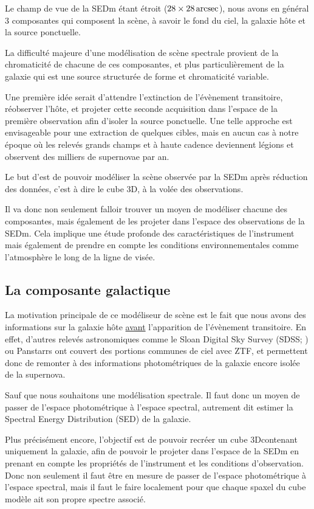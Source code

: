 \documentclass[../main/main.tex]{subfiles}
\begin{document}
Le champ de vue de la SEDm étant étroit ($28\times28\arcsec$), nous
avons en général $3$ composantes qui composent la
scène, à savoir le fond du ciel, la galaxie hôte et la source ponctuelle.

La difficulté majeure d'une modélisation de scène spectrale provient de la chromaticité de chacune de ces
composantes, et plus particulièrement de la galaxie qui est une source
structurée de forme et chromaticité variable.

Une première idée serait d'attendre l'extinction de l'évènement
transitoire, réobserver l'hôte, et projeter cette seconde acquisition
dans l'espace de la première observation afin d'isoler la source
ponctuelle. Une telle approche est envisageable pour une extraction de
quelques cibles, mais en aucun cas à notre époque où les relevés grands
champs et à haute cadence deviennent légions et observent des milliers
de supernovae par an.

Le but d'\hypergal est de pouvoir modéliser la scène observée
par la SEDm après réduction des données, c'est à dire le cube 3D, à la
volée des observations.

Il va donc non seulement falloir trouver un moyen de modéliser chacune
des composantes, mais également de les projeter dans l'espace des
observations de la SEDm. Cela implique une étude profonde des caractéristiques de
l'instrument mais également de prendre en compte les conditions
environnementales comme l'atmosphère le long de la ligne de visée.


\subsection{La composante galactique}

La motivation principale de ce modéliseur de scène est le fait que nous
avons des informations sur la galaxie hôte \underline{avant}
l'apparition de l'évènement transitoire. En effet, d'autres relevés
astronomiques comme le Sloan Digital Sky Survey (SDSS;
\citet{YorkSDSS2000}) ou Panstarrs \citep{ChambersPanstarrs} ont couvert
des portions communes de ciel avec ZTF, et permettent donc de remonter à
des informations photométriques de la galaxie encore isolée de la supernova.

Sauf que nous souhaitons une modélisation spectrale. Il faut donc un
moyen de passer de l'espace photométrique à l'espace spectral, autrement
dit estimer la Spectral Energy Distribution (SED) de la galaxie. 

Plus précisément encore, l'objectif est de pouvoir recréer un cube
3Dcontenant uniquement la galaxie, afin de pouvoir le projeter dans
l'espace de la SEDm en prenant en compte les propriétés de l'instrument et les
conditions d'observation. 
Donc non seulement il faut être en mesure de passer de l'espace
photométrique à l'espace spectral, mais il faut le faire localement pour
que chaque spaxel du cube modèle ait son propre spectre associé.
\end{document}
